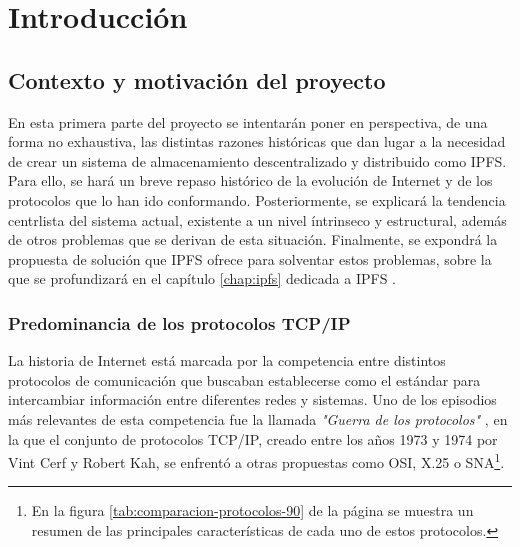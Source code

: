 \chapter{Introducción}

\section{Contexto y motivación del proyecto}


En esta primera parte del proyecto se intentarán poner en perspectiva, de una forma no exhaustiva, las distintas razones
históricas que dan lugar a la necesidad de crear un sistema de almacenamiento descentralizado y distribuido como IPFS.
Para ello, se hará un breve repaso histórico de la evolución de Internet y de los protocolos que lo han ido conformando.
Posteriormente, se explicará la tendencia centrlista del sistema actual, existente a un nivel íntrinseco y estructural,
además de otros problemas que se derivan de esta situación.
Finalmente, se expondrá la propuesta de solución que IPFS ofrece para solventar estos problemas, sobre la que se profundizará en el capítulo \ref{chap:ipfs} dedicada a IPFS .

\subsection{Predominancia de los protocolos TCP/IP}
La historia de Internet está marcada por la competencia entre distintos protocolos de comunicación que buscaban establecerse
como el estándar para intercambiar información entre diferentes redes y sistemas. Uno de los episodios más relevantes de esta
competencia fue la llamada \textit{"Guerra de los protocolos"} \cite{ProtocolWars2023}, en la que el conjunto de protocolos TCP/IP, creado entre los
años 1973 y 1974 por Vint Cerf y Robert Kah, se enfrentó a otras propuestas como OSI, X.25 o SNA\footnote{En la figura \ref{tab:comparacion-protocolos-90} de la página \pageref{tab:comparacion-protocolos-90} se muestra un resumen de las principales características de cada uno de estos protocolos.
}.

